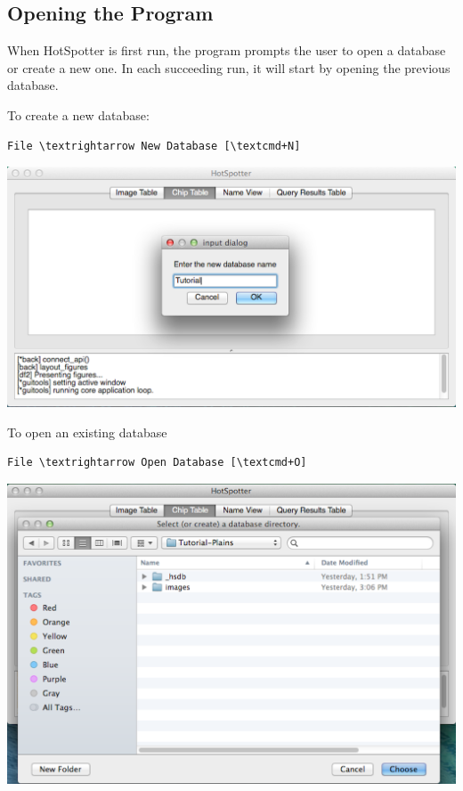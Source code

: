\documentclass[a4paper,10pt]{article}
\begin{document}
    \subsection{Opening the Program}
    When HotSpotter is first run, the program prompts the user to open a
    database or create a new one.  In each succeeding run, it will start by
    opening the previous database. 

    \renewcommand{\textrightarrow}{$\rightarrow$}
    \newcommand{\textcmd}{\cmdkey}

    To create a new database: \\
    \begin{Verbatim}[commandchars=\\\{\}]
    File \textrightarrow New Database [\textcmd+N]
    \end{Verbatim}

    \begin{center}
        \includegraphics[scale=0.15]{images/start-new.png}
    \end{center}

    To open an existing database
    \begin{Verbatim}[commandchars=\\\{\}]
    File \textrightarrow Open Database [\textcmd+O]
    \end{Verbatim}

    \begin{center}
        \includegraphics[scale=0.15]{images/start-open.png}
    \end{center}
\end{document}
